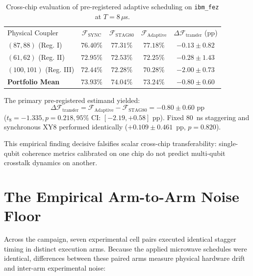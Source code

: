 \documentclass[aps,prl,twocolumn,amsmath,amssymb,superscriptaddress,floatfix]{revtex4-2}
\begin{document}
\begin{table}[h]
\caption{Cross-chip evaluation of pre-registered adaptive scheduling on \texttt{ibm\_fez} at $T = 8\,\mu$s.}
\label{tab:fez}
\begin{ruledtabular}
\begin{tabular}{lcccc}
Physical Coupler & $\mathcal{F}_{\text{SYNC}}$ & $\mathcal{F}_{\text{STAG80}}$ & $\mathcal{F}_{\text{Adaptive}}$ & $\Delta \mathcal{F}_{\text{transfer}}$ (pp) \\
\colrule
$(87, 88)$ (Reg. I) & $76.40\%$ & $77.31\%$ & $77.18\%$ & $-0.13 \pm 0.82$ \\
$(61, 62)$ (Reg. II) & $72.95\%$ & $72.53\%$ & $72.25\%$ & $-0.28 \pm 1.43$ \\
$(100, 101)$ (Reg. III) & $72.44\%$ & $72.28\%$ & $70.28\%$ & $-2.00 \pm 0.73$ \\
\colrule
\textbf{Portfolio Mean} & $\mathbf{73.93\%}$ & $\mathbf{74.04\%}$ & $\mathbf{73.24\%}$ & $\mathbf{-0.80 \pm 0.60}$ \\
\end{tabular}
\end{ruledtabular}
\end{table}

The primary pre-registered estimand yielded:
\begin{equation}
\Delta \mathcal{F}_{\text{transfer}} = \mathcal{F}_{\text{Adaptive}} - \mathcal{F}_{\text{STAG80}} = -0.80 \pm 0.60\text{ pp}
\end{equation}
($t_8 = -1.335, p = 0.218, 95\%\text{ CI: } [-2.19, +0.58]\text{ pp}$). Fixed 80~ns staggering and synchronous XY8 performed identically ($+0.109 \pm 0.461$~pp, $p = 0.820$). 

This empirical finding decisive falsifies scalar cross-chip transferability: single-qubit coherence metrics calibrated on one chip do not predict multi-qubit crosstalk dynamics on another.

\section{The Empirical Arm-to-Arm Noise Floor}
Across the campaign, seven experimental cell pairs executed identical stagger timing in distinct execution arms. Because the applied microwave schedules were identical, differences between these paired arms measure physical hardware drift and inter-arm experimental noise:
\end{document}
